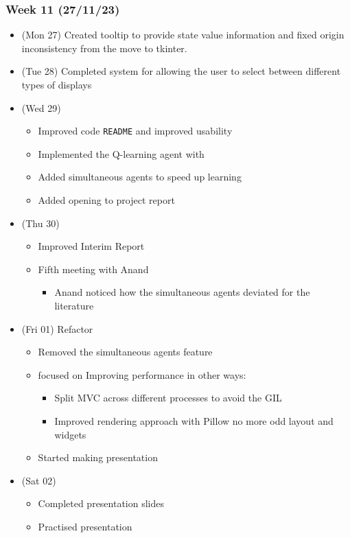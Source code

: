 \newpage
\hypertarget{week-11-271123}{%
\subsubsection{Week 11 (27/11/23)}\label{week-11-271123}}

\begin{itemize}
\tightlist
\item
  (Mon 27) Created tooltip to provide state value information and fixed
  origin inconsistency from the move to tkinter.
\item
  (Tue 28) Completed system for allowing the user to select between
  different types of displays
\item
  (Wed 29)

  \begin{itemize}
  \tightlist
  \item
    Improved code \texttt{README} and improved usability
  \item
    Implemented the Q-learning agent with
  \item
    Added simultaneous agents to speed up learning
  \item
    Added opening to project report
  \end{itemize}
\item
  (Thu 30)

  \begin{itemize}
  \tightlist
  \item
    Improved Interim Report
  \item
    Fifth meeting with Anand

    \begin{itemize}
    \tightlist
    \item
      Anand noticed how the simultaneous agents deviated for the
      literature
    \end{itemize}
  \end{itemize}
\item
  (Fri 01) Refactor

  \begin{itemize}
  \tightlist
  \item
    Removed the simultaneous agents feature
  \item
    focused on Improving performance in other ways:

    \begin{itemize}
    \tightlist
    \item
      Split MVC across different processes to avoid the GIL
    \item
      Improved rendering approach with Pillow no more odd layout and
      widgets
    \end{itemize}
  \item
    Started making presentation
  \end{itemize}
\item
  (Sat 02)

  \begin{itemize}
  \tightlist
  \item
    Completed presentation slides
  \item
    Practised presentation
  \end{itemize}
\end{itemize}

